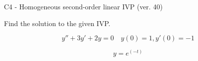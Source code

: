 \begin{exercise}
  \begin{exerciseTitle}C4 - Homogeneous second-order linear IVP (ver. 40)\end{exerciseTitle}
  \begin{exerciseStatement}
    
Find the solution to the given IVP.

    
\[y''+3y'+2y = 0 \hspace{1em} y(0) = 1 , y'(0) = -1\]

  \end{exerciseStatement}
  \begin{exerciseAnswer}
    
\[y= e^{\left(-t\right)}\]

  \end{exerciseAnswer}
\end{exercise}